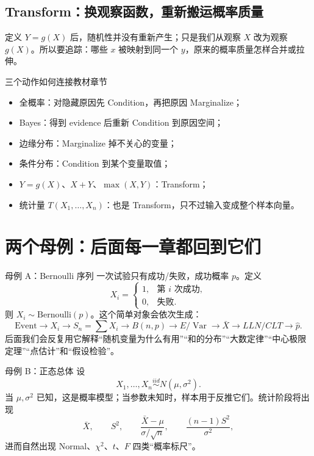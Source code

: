 \documentclass[11pt,a4paper,openany]{ctexbook}
\begin{document}
\subsection{Transform：换观察函数，重新搬运概率质量}
定义 $Y=g(X)$ 后，随机性并没有重新产生；只是我们从观察 $X$ 改为观察 $g(X)$。所以要追踪：哪些 $x$ 被映射到同一个 $y$，原来的概率质量怎样合并或拉伸。

\begin{methodbox}{三个动作如何连接教材章节}
\begin{itemize}
  \item 全概率：对隐藏原因先 Condition，再把原因 Marginalize；
  \item Bayes：得到 evidence 后重新 Condition 到原因空间；
  \item 边缘分布：Marginalize 掉不关心的变量；
  \item 条件分布：Condition 到某个变量取值；
  \item $Y=g(X)$、$X+Y$、$ \max(X,Y)$：Transform；
  \item 统计量 $T(X_1,\dots,X_n)$：也是 Transform，只不过输入变成整个样本向量。
\end{itemize}
\end{methodbox}

\section{两个母例：后面每一章都回到它们}

\begin{examplebox}{母例 A：Bernoulli 序列}
一次试验只有成功/失败，成功概率 $p$。定义
\[
X_i=\begin{cases}1,&\text{第 }i\text{ 次成功},\\0,&\text{失败}.\end{cases}
\]
则 $X_i\sim \text{Bernoulli}(p)$。这个简单对象会依次生成：
\[
\text{Event}\to X_i\to S_n=\sum X_i\to B(n,p)\to E/\operatorname{Var}\to \bar X\to LLN/CLT\to \hat p.
\]
后面我们会反复用它解释“随机变量为什么有用”“和的分布”“大数定律”“中心极限定理”“点估计”和“假设检验”。
\end{examplebox}

\begin{examplebox}{母例 B：正态总体}
设
\[
X_1,\dots,X_n\overset{iid}{\sim}N(\mu,\sigma^2).
\]
当 $\mu,\sigma^2$ 已知，这是概率模型；当参数未知时，样本用于反推它们。统计阶段将出现
\[
\bar X,\qquad S^2,\qquad \frac{\bar X-\mu}{\sigma/\sqrt n},\qquad \frac{(n-1)S^2}{\sigma^2},
\]
进而自然出现 Normal、$\chi^2$、$t$、$F$ 四类“概率标尺”。
\end{examplebox}
\end{document}
